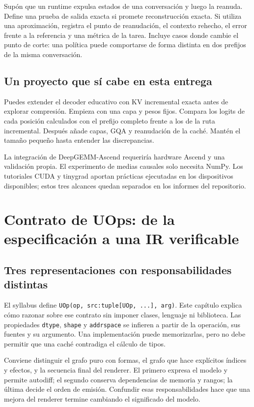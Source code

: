 \documentclass[12pt,a4paper,oneside]{report}
\begin{document}
\begin{practica}
Supón que un runtime expulsa estados de una conversación y luego la reanuda. Define una prueba de salida exacta si promete reconstrucción exacta. Si utiliza una aproximación, registra el punto de reanudación, el contexto rehecho, el error frente a la referencia y una métrica de la tarea. Incluye casos donde cambie el punto de corte: una política puede comportarse de forma distinta en dos prefijos de la misma conversación.

\end{practica}
\section{Un proyecto que sí cabe en esta entrega}
Puedes extender el decoder educativo con KV incremental exacta antes de explorar compresión. Empieza con una capa y pesos fijos. Compara los logits de cada posición calculados con el prefijo completo frente a los de la ruta incremental. Después añade capas, GQA y reanudación de la caché. Mantén el tamaño pequeño hasta entender las discrepancias.

La integración de DeepGEMM-Ascend requeriría hardware Ascend y una validación propia. El experimento de medias causales solo necesita NumPy. Los tutoriales CUDA y tinygrad aportan prácticas ejecutadas en los dispositivos disponibles; estos tres alcances quedan separados en los informes del repositorio.


\chapter{Contrato de UOps: de la especificación a una IR verificable}
\label{curso:contrato}
\section{Tres representaciones con responsabilidades distintas}
El syllabus define \texttt{UOp(op, src:\allowbreak{}tuple[UOp, .\allowbreak{}..], arg)}. Este capítulo explica cómo razonar sobre ese contrato sin imponer clases, lenguaje ni biblioteca. Las propiedades \texttt{dtype}, \texttt{shape} y \texttt{addrspace} se infieren a partir de la operación, sus fuentes y su argumento. Una implementación puede memorizarlas, pero no debe permitir que una caché contradiga el cálculo de tipos.

Conviene distinguir el grafo puro con formas, el grafo que hace explícitos índices y efectos, y la secuencia final del renderer. El primero expresa el modelo y permite autodiff; el segundo conserva dependencias de memoria y rangos; la última decide el orden de emisión. Confundir esas responsabilidades hace que una mejora del renderer termine cambiando el significado del modelo.
\end{document}
